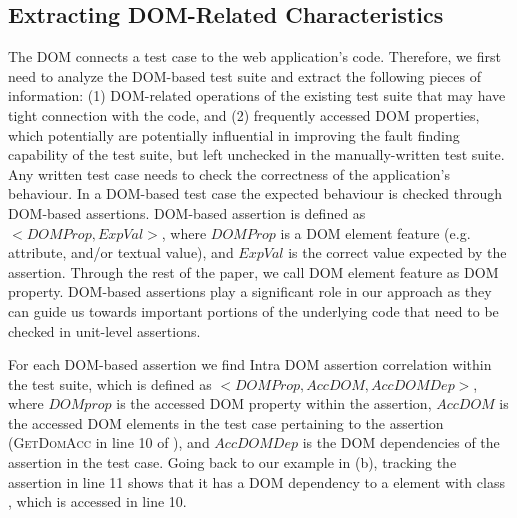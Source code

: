 \subsection{Extracting DOM-Related Characteristics} \label{Sec:extractDomRelatedInfo}
The DOM connects a test case to the web application's code. Therefore, we first need to analyze the DOM-based test suite and extract the following pieces of information: (1) DOM-related operations of the existing test suite that may have tight connection with the \javascript code, and (2) frequently accessed DOM properties, which potentially are potentially influential in improving the fault finding capability of the test suite, but left unchecked in the manually-written test suite.
Any written test case needs to check the correctness of the application's behaviour. In a DOM-based test case the expected behaviour is checked through DOM-based assertions.
DOM-based assertion is defined as $<DOMProp,ExpVal>$, where $DOMProp$ is a DOM element feature (e.g. attribute, and/or textual value), and $ExpVal$ is the correct value expected by the assertion. Through the rest of the paper, we call DOM element feature as DOM property. 
DOM-based assertions play a significant role in our approach as they can guide us towards important portions of the underlying \javascript code that need to be checked in unit-level assertions.

For each DOM-based assertion we find Intra DOM assertion correlation within the test suite, which is defined as $<DOMProp, AccDOM, AccDOMDep>$, where $DOMprop$ is the accessed DOM property within the assertion, $AccDOM$ is the accessed DOM elements in the test case pertaining to the assertion (\textsc{GetDomAcc} in line 10 of ), and $AccDOMDep$ is the DOM dependencies of the assertion in the test case.
Going back to our example in (b), tracking the assertion in line 11 shows that it has a DOM dependency to a  element with class , which is accessed in line 10.   
 
